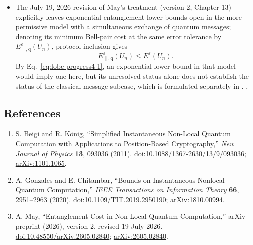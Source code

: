 \begin{itemize}
  \item The July 19, 2026 revision of May's treatment (version 2, Chapter 13) explicitly leaves exponential entanglement lower bounds open in the more permissive model with a simultaneous exchange of quantum messages; denoting its minimum Bell-pair cost at the same error tolerance by $E_{\parallel,\mathrm q}^{\varepsilon}(U_n)$, protocol inclusion gives
  \begin{equation}
E_{\parallel,\mathrm q}^{\varepsilon}(U_n)
  \leq E_{\parallel}^{\varepsilon}(U_n).
\label{eq:lobc-progress4-1}
\end{equation}
  By Eq.~\eqref{eq:lobc-progress4-1}, an exponential lower bound in that model would imply one here, but its unresolved status alone does not establish the status of the classical-message subcase, which is formulated separately in . , 
\end{itemize}

\subsection*{References}

\begin{enumerate}[label={},leftmargin=4.8em,labelsep=0.5em]
  \footnotesize
  \item[\textup{[BK11]}]\label{ref:lobc-teleportation}
  S. Beigi and R. König, ``Simplified Instantaneous Non-Local Quantum Computation with Applications to Position-Based Cryptography,'' \emph{New Journal of Physics} \textbf{13}, 093036 (2011). \href{https://doi.org/10.1088/1367-2630/13/9/093036}{doi:10.1088/1367-2630/13/9/093036}; \href{https://arxiv.org/abs/1101.1065}{arXiv:1101.1065}.

  \item[\textup{[GC20]}]\label{ref:lobc-bounds}
  A. Gonzales and E. Chitambar, ``Bounds on Instantaneous Nonlocal Quantum Computation,'' \emph{IEEE Transactions on Information Theory} \textbf{66}, 2951–2963 (2020). \href{https://doi.org/10.1109/TIT.2019.2950190}{doi:10.1109/TIT.2019.2950190}; \href{https://arxiv.org/abs/1810.00994}{arXiv:1810.00994}.

  \item[\textup{[May26]}]\label{ref:lobc-may}
  A. May, ``Entanglement Cost in Non-Local Quantum Computation,'' arXiv preprint (2026), version 2, revised 19 July 2026. \href{https://doi.org/10.48550/arXiv.2605.02840}{doi:10.48550/arXiv.2605.02840}; \href{https://arxiv.org/abs/2605.02840}{arXiv:2605.02840}.
\end{enumerate}

